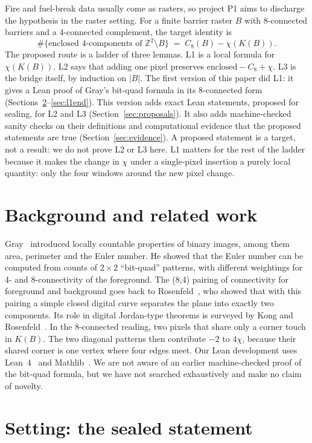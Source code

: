 \documentclass[11pt]{article}
\theoremstyle{definition}
\theoremstyle{remark}
\begin{document}
Fire and fuel-break data usually come as rasters, so project P1 aims to
discharge the hypothesis in the raster setting. For a finite barrier raster $B$
with 8-connected barriers and a 4-connected complement, the target identity is
\[
  \#\{\text{enclosed 4-components of } \mathbb{Z}^2\setminus B\}
  \;=\; C_8(B) - \chi(K(B)).
\]
The proposed route is a ladder of three lemmas. L1 is a local formula for
$\chi(K(B))$. L2 says that adding one pixel preserves
$\text{enclosed} - C_8 + \chi$. L3 is the bridge itself, by induction on $|B|$.
The first version of this paper did L1: it gives a Lean proof of Gray's
bit-quad formula in its 8-connected form (Sections~\ref{sec:l1start}--\ref{sec:l1end}).
This version adds exact Lean statements, proposed for sealing, for L2 and L3
(Section~\ref{sec:proposals}). It also adds machine-checked sanity checks on
their definitions and computational evidence that the proposed statements are
true (Section~\ref{sec:evidence}). A proposed statement is a target, not a
result: we do not prove L2 or L3 here. L1 matters for the rest of the ladder because it makes the
change in $\chi$ under a single-pixel insertion a purely local quantity: only
the four windows around the new pixel change.

\section{Background and related work}

Gray~\cite{Gray1971} introduced locally countable properties of binary images,
among them area, perimeter and the Euler number. He showed that the Euler number
can be computed from counts of $2\times2$ ``bit-quad'' patterns, with different
weightings for 4- and 8-connectivity of the foreground. The (8,4) pairing of
connectivity for foreground and background goes back to
Rosenfeld~\cite{Rosenfeld1970}, who showed that with this pairing a simple closed
digital curve separates the plane into exactly two components. Its role in
digital Jordan-type theorems is surveyed by Kong and
Rosenfeld~\cite{KongRosenfeld1989}.
In the 8-connected reading, two pixels that share only a corner touch in $K(B)$.
The two diagonal patterns then contribute $-2$ to $4\chi$, because their
shared corner is one vertex where four edges meet. Our Lean development uses
Lean~4~\cite{Lean4} and Mathlib~\cite{Mathlib2020}. We are not aware of an
earlier machine-checked proof of the bit-quad formula, but we have not searched
exhaustively and make no claim of novelty.

\section{Setting: the sealed statement}\label{sec:l1start}
\end{document}
